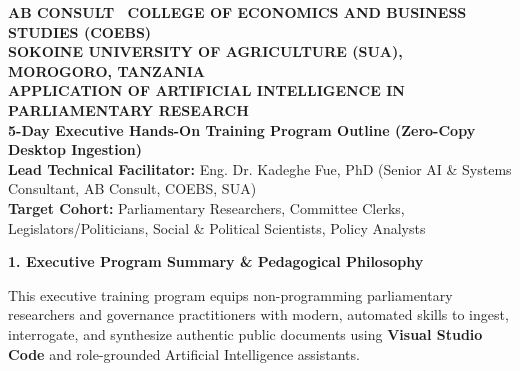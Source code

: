 \documentclass[10pt, a4paper]{article}
\begin{document}
\begin{center}
    {\large \textbf{\textcolor{tanzaniablue}{AB CONSULT \textbullet\ COLLEGE OF ECONOMICS AND BUSINESS STUDIES (COEBS)}}}\\[0.1cm]
    {\small \textbf{SOKOINE UNIVERSITY OF AGRICULTURE (SUA), MOROGORO, TANZANIA}}\\[0.25cm]
    {\LARGE \textbf{\textcolor{suagreen}{APPLICATION OF ARTIFICIAL INTELLIGENCE IN PARLIAMENTARY RESEARCH}}}\\[0.15cm]
    {\large \textbf{5-Day Executive Hands-On Training Program Outline (Zero-Copy Desktop Ingestion)}}\\[0.15cm]
    {\footnotesize \textbf{Lead Technical Facilitator:} Eng. Dr. Kadeghe Fue, PhD (Senior AI \& Systems Consultant, AB Consult, COEBS, SUA)}\\
    {\footnotesize \textbf{Target Cohort:} Parliamentary Researchers, Committee Clerks, Legislators/Politicians, Social \& Political Scientists, Policy Analysts}
\end{center}
\vspace{-0.2cm}

\noindent\textbf{\textcolor{tanzaniablue}{\large 1. Executive Program Summary \& Pedagogical Philosophy}}
\vspace{0.1cm}

\noindent This executive training program equips non-programming parliamentary researchers and governance practitioners with modern, automated skills to ingest, interrogate, and synthesize authentic public documents using \textbf{Visual Studio Code} and role-grounded Artificial Intelligence assistants.

\vspace{0.15cm}
\noindent{}
\end{document}
